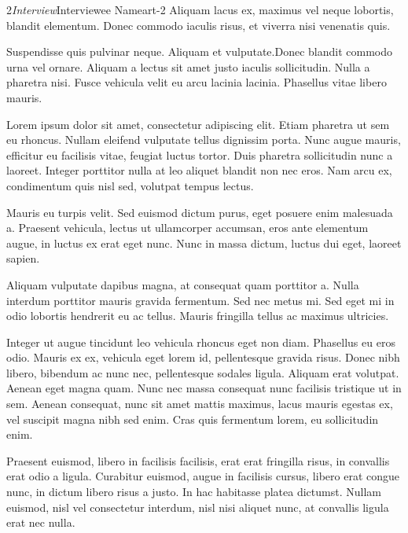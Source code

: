 \documentclass[12pt]{papertex}
\begin{document}
\color{GreenYellow}
\begin{shortnews}{2}{\textit{Interview}\hfill}{\hfill\small Interviewee Name}{art-2}
    Aliquam lacus ex, maximus vel neque lobortis, blandit elementum. Donec commodo iaculis risus, et viverra nisi venenatis quis.

    Suspendisse quis pulvinar neque. Aliquam et vulputate.Donec blandit commodo urna vel ornare. Aliquam a lectus sit amet justo iaculis sollicitudin. Nulla a pharetra nisi. Fusce vehicula velit eu arcu lacinia lacinia. Phasellus vitae libero mauris. 
    
    Lorem ipsum dolor sit amet, consectetur adipiscing elit. Etiam pharetra ut sem eu rhoncus. Nullam eleifend vulputate tellus dignissim porta. Nunc augue mauris, efficitur eu facilisis vitae, feugiat luctus tortor. Duis pharetra sollicitudin nunc a laoreet. Integer porttitor nulla at leo aliquet blandit non nec eros. Nam arcu ex, condimentum quis nisl sed, volutpat tempus lectus.


    Mauris eu turpis velit. Sed euismod dictum purus, eget posuere enim malesuada a. Praesent vehicula, lectus ut ullamcorper accumsan, eros ante elementum augue, in luctus ex erat eget nunc. Nunc in massa dictum, luctus dui eget, laoreet sapien.


    Aliquam vulputate dapibus magna, at consequat quam porttitor a. Nulla interdum porttitor mauris gravida fermentum. Sed nec metus mi. Sed eget mi in odio lobortis hendrerit eu ac tellus. Mauris fringilla tellus ac maximus ultricies.

    Integer ut augue tincidunt leo vehicula rhoncus eget non diam. Phasellus eu eros odio. Mauris ex ex, vehicula eget lorem id, pellentesque gravida risus. Donec nibh libero, bibendum ac nunc nec, pellentesque sodales ligula. Aliquam erat volutpat. Aenean eget magna quam. Nunc nec massa consequat nunc facilisis tristique ut in sem. Aenean consequat, nunc sit amet mattis maximus, lacus mauris egestas ex, vel suscipit magna nibh sed enim. Cras quis fermentum lorem, eu sollicitudin enim.

    Praesent euismod, libero in facilisis facilisis, erat erat fringilla risus, in convallis erat odio a ligula. Curabitur euismod, augue in facilisis cursus, libero erat congue nunc, in dictum libero risus a justo. In hac habitasse platea dictumst. Nullam euismod, nisl vel consectetur interdum, nisl nisi aliquet nunc, at convallis ligula erat nec nulla. 
\end{shortnews}
\end{document}
